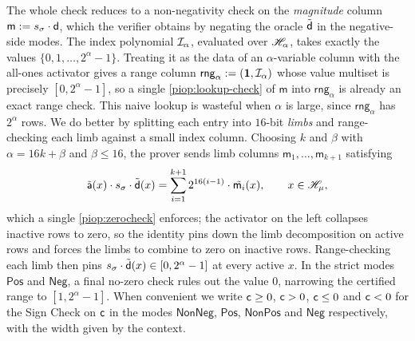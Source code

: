 The whole check reduces to a non-negativity check on the \emph{magnitude} column $\mathsf{m} := s_\sigma\cdot\mathsf{d}$, which the verifier obtains by negating the oracle $\tilde{\mathsf{d}}$ in the negative-side modes. The index polynomial $\mathcal{I}_\alpha$, evaluated over $\mathscr{H}_{\alpha}$, takes exactly the values $\{0, 1, \ldots, 2^\alpha - 1\}$. Treating it as the data of an $\alpha$-variable column with the all-ones activator gives a range column $\mathsf{rng}_\alpha := (\mathbf{1}, \mathcal{I}_\alpha)$ whose value multiset is precisely $[0, 2^\alpha - 1]$, so a single \cref{piop:lookup-check} of $\mathsf{m}$ into $\mathsf{rng}_\alpha$ is already an exact range check. This naive lookup is wasteful when $\alpha$ is large, since $\mathsf{rng}_\alpha$ has $2^\alpha$ rows. We do better by splitting each entry into $16$-bit \emph{limbs} and range-checking each limb against a small index column. Choosing $k$ and $\beta$ with $\alpha = 16k + \beta$ and $\beta \leq 16$, the prover sends limb columns $\mathsf{m}_1, \ldots, \mathsf{m}_{k+1}$ satisfying
\begin{displaymath}
  \tilde{\mathsf{a}}(x) \cdot s_\sigma \cdot \tilde{\mathsf{d}}(x) = \sum_{i=1}^{k+1} 2^{16(i-1)} \cdot \tilde{\mathsf{m}_i}(x), \qquad x \in \mathscr{H}_{\mu},
\end{displaymath}
which a single \cref{piop:zerocheck} enforces; the activator on the left collapses inactive rows to zero, so the identity pins down the limb decomposition on active rows and forces the limbs to combine to zero on inactive rows. Range-checking each limb then pins $s_\sigma\cdot\tilde{\mathsf{d}}(x) \in [0, 2^\alpha - 1]$ at every active $x$. In the strict modes $\mathsf{Pos}$ and $\mathsf{Neg}$, a final no-zero check rules out the value $0$, narrowing the certified range to $[1, 2^\alpha - 1]$. When convenient we write $\mathsf{c} \geq 0$, $\mathsf{c} > 0$, $\mathsf{c} \leq 0$ and $\mathsf{c} < 0$ for the Sign Check on $\mathsf{c}$ in the modes $\mathsf{NonNeg}$, $\mathsf{Pos}$, $\mathsf{NonPos}$ and $\mathsf{Neg}$ respectively, with the width given by the context.
